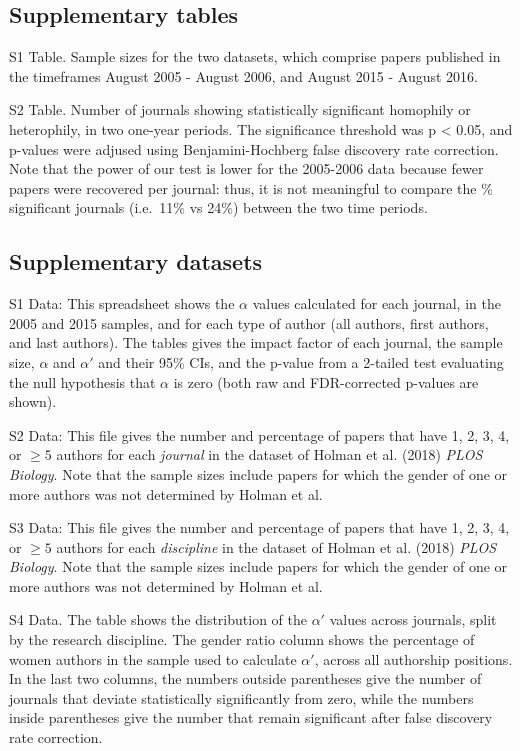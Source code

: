 \documentclass[12pt,]{article}
\begin{document}
\subsection{Supplementary tables}\label{supplementary-tables}

S1 Table. Sample sizes for the two datasets, which comprise papers
published in the timeframes August 2005 - August 2006, and August 2015 -
August 2016.

S2 Table. Number of journals showing statistically significant homophily
or heterophily, in two one-year periods. The significance threshold was
p \textless{} 0.05, and p-values were adjused using Benjamini-Hochberg
false discovery rate correction. Note that the power of our test is
lower for the 2005-2006 data because fewer papers were recovered per
journal: thus, it is not meaningful to compare the \% significant
journals (i.e.~11\% vs 24\%) between the two time periods.

\subsection{Supplementary datasets}\label{supplementary-datasets}

S1 Data: This spreadsheet shows the \(\alpha\) values calculated for
each journal, in the 2005 and 2015 samples, and for each type of author
(all authors, first authors, and last authors). The tables gives the
impact factor of each journal, the sample size, \(\alpha\) and
\(\alpha'\) and their 95\% CIs, and the p-value from a 2-tailed test
evaluating the null hypothesis that \(\alpha\) is zero (both raw and
FDR-corrected p-values are shown).

S2 Data: This file gives the number and percentage of papers that have
1, 2, 3, 4, or \({\ge}5\) authors for each \emph{journal} in the dataset
of Holman et al. (2018) \emph{PLOS Biology}. Note that the sample sizes
include papers for which the gender of one or more authors was not
determined by Holman et al.

S3 Data: This file gives the number and percentage of papers that have
1, 2, 3, 4, or \({\ge}5\) authors for each \emph{discipline} in the
dataset of Holman et al. (2018) \emph{PLOS Biology}. Note that the
sample sizes include papers for which the gender of one or more authors
was not determined by Holman et al.

S4 Data. The table shows the distribution of the \(\alpha'\) values
across journals, split by the research discipline. The gender ratio
column shows the percentage of women authors in the sample used to
calculate \(\alpha'\), across all authorship positions. In the last two
columns, the numbers outside parentheses give the number of journals
that deviate statistically significantly from zero, while the numbers
inside parentheses give the number that remain significant after false
discovery rate correction.
\end{document}
